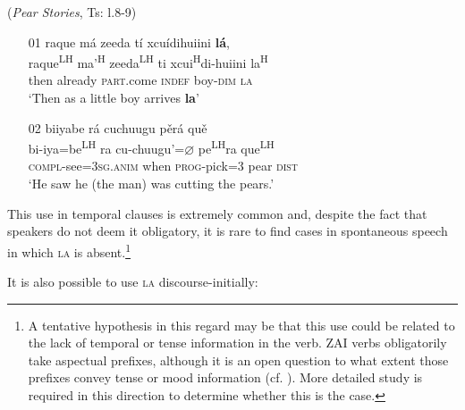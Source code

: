 \newpage 
\ea\label{temporal2} (\textit{Pear Stories}, Ts: l.8-9)
\begin{itemize}
\item[01]
\glll raque m\'{a} zeeda t\'{i} xcu\'{i}dihuiini \textbf{l\'{a}},  \\
raque\textsuperscript{LH} ma'\textsuperscript{H} zeeda\textsuperscript{LH} ti xcui\textsuperscript{H}di-huiini la\textsuperscript{H}  \\
then already \textsc{part}.come \textsc{indef} boy-\textsc{dim} \textsc{la}  \\
\glt `Then as a little boy arrives \textbf{la}'  


\item[02]
\glll biiyabe r\'{a} cuchuugu p\v{e}r\'{a} qu\v{e}  \\
bi-iya=be\textsuperscript{LH} ra cu-chuugu'=$\varnothing$ pe\textsuperscript{LH}ra que\textsuperscript{LH}  \\
\textsc{compl}-see=3\textsc{sg.anim} when \textsc{prog}-pick=3 pear \textsc{dist}  \\
\glt `He saw he (the man) was cutting the pears.' 

\end{itemize}
\z
This use in temporal clauses is extremely common and, despite the fact that speakers do not deem it obligatory, it is rare to find cases in spontaneous speech in which \textsc{la} is absent.\footnote{A tentative hypothesis in this regard may be that this use could be related to the lack of temporal or tense information in the verb. ZAI verbs obligatorily take aspectual prefixes, although it is an open question to what extent those prefixes convey tense or mood information (cf. ). More detailed study is required in this direction to determine whether this is the case.}

It is also possible to use \textsc{la} discourse-initially:


